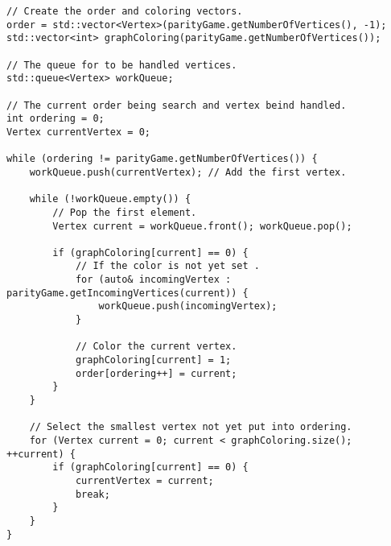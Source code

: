 \documentclass[10pt,a4paper]{article}
\begin{document}
\begin{verbatim}
// Create the order and coloring vectors.
order = std::vector<Vertex>(parityGame.getNumberOfVertices(), -1);
std::vector<int> graphColoring(parityGame.getNumberOfVertices());

// The queue for to be handled vertices.
std::queue<Vertex> workQueue;

// The current order being search and vertex beind handled.
int ordering = 0;
Vertex currentVertex = 0;

while (ordering != parityGame.getNumberOfVertices()) {
	workQueue.push(currentVertex); // Add the first vertex.

    while (!workQueue.empty()) {
    	// Pop the first element.
        Vertex current = workQueue.front(); workQueue.pop();

        if (graphColoring[current] == 0) {
        	// If the color is not yet set .
            for (auto& incomingVertex : parityGame.getIncomingVertices(current)) {
            	workQueue.push(incomingVertex);
            }

            // Color the current vertex.
            graphColoring[current] = 1;
            order[ordering++] = current;
        }
    }

    // Select the smallest vertex not yet put into ordering.
    for (Vertex current = 0; current < graphColoring.size(); ++current) {
    	if (graphColoring[current] == 0) {
        	currentVertex = current;
            break;
        }
    }
}
\end{verbatim}
\end{document}
